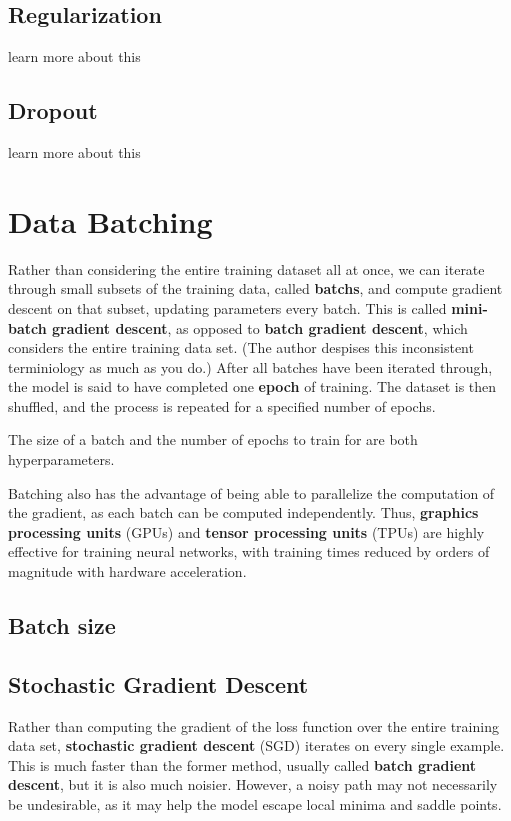 \documentclass[12pt]{report}
\theoremstyle{definition}
\theoremstyle{remark}
\begin{document}
\subsection{Regularization}

learn more about this

\subsection{Dropout}
learn more about this


\section{Data Batching}

Rather than considering the entire training dataset all at once, we can iterate through small subsets of the training data, called \textbf{\glspl{batch}}, and compute gradient descent on that subset, updating parameters every batch. This is called \textbf{mini-batch gradient descent}, as opposed to \textbf{batch gradient descent}, which considers the entire training data set. (The author despises this inconsistent terminiology as much as you do.) After all batches have been iterated through, the model is said to have completed one \textbf{epoch} of training. The dataset is then shuffled, and the process is repeated for a specified number of epochs.

The size of a batch and the number of epochs to train for are both hyperparameters.

Batching also has the advantage of being able to parallelize the computation of the gradient, as each batch can be computed independently. Thus, \textbf{graphics processing units} (GPUs) and \textbf{tensor processing units} (TPUs) are highly effective for training neural networks, with training times reduced by orders of magnitude with hardware acceleration.

\subsection{Batch size}

\subsection{Stochastic Gradient Descent}

Rather than computing the gradient of the loss function over the entire training data set, \textbf{stochastic gradient descent} (SGD) iterates on every single example. This is much faster than the former method, usually called \textbf{batch gradient descent}, but it is also much noisier. However, a noisy path may not necessarily be undesirable, as it may help the model escape local minima and saddle points.
\end{document}
